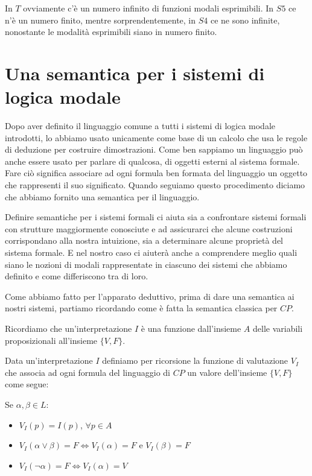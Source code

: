 \documentclass[a4paper, 12pt]{article}
\begin{document}
In $T$ ovviamente c'è un numero infinito di funzioni modali esprimibili.
In $S5$ ce n'è un numero finito, mentre sorprendentemente,
in $S4$ ce ne sono infinite, nonostante le modalità esprimibili siano in numero finito.

\section{Una semantica per i sistemi di logica modale}
Dopo aver definito il linguaggio comune a tutti i sistemi di logica modale introdotti,
lo abbiamo usato unicamente come base di un calcolo che usa le regole di deduzione per costruire
dimostrazioni. Come ben sappiamo un linguaggio può anche essere usato per parlare di qualcosa,
di oggetti esterni al sistema formale.
Fare ciò significa associare ad ogni formula ben formata del linguaggio un oggetto
che rappresenti il suo significato.
Quando seguiamo questo procedimento diciamo che abbiamo fornito una semantica per il linguaggio.

Definire semantiche per i sistemi formali ci aiuta sia a confrontare sistemi formali
con strutture maggiormente conosciute e ad assicurarci
che alcune costruzioni corrispondano alla nostra intuizione,
sia a determinare alcune proprietà del sistema formale. E nel nostro caso ci aiuterà anche
a comprendere meglio quali siano le nozioni di modali rappresentate in ciascuno dei sistemi
che abbiamo definito e come differiscono tra di loro.


Come abbiamo fatto per l'apparato deduttivo, prima di dare una semantica ai nostri sistemi,
partiamo ricordando come è fatta la semantica classica per $CP$.

Ricordiamo che un'interpretazione $I$ è una funzione dall'insieme $A$ delle variabili proposizionali
all'insieme $\{V, F\}$.

Data un'interpretazione $I$ definiamo per ricorsione la funzione di valutazione $V_I$ che associa ad ogni formula
del linguaggio di $CP$ un valore dell'insieme $\{V, F\}$ come segue:

Se $\alpha, \beta \in L$:
\begin{itemize}
\item $V_I(p) = I(p)$, $\forall p \in A$
\item $V_I(\alpha \vee \beta) = F \Leftrightarrow V_I(\alpha) = F$ e $V_I(\beta) = F$
\item $V_I(\neg \alpha) = F \Leftrightarrow V_I(\alpha) = V$
\end{itemize}
\end{document}
